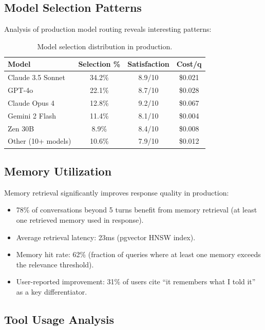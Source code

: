 \subsection{Model Selection Patterns}

Analysis of production model routing reveals interesting patterns:

\begin{table}[H]
\centering
\small
\begin{tabular}{lccc}
\toprule
\textbf{Model} & \textbf{Selection \%} & \textbf{Satisfaction} & \textbf{Cost/q} \\
\midrule
Claude 3.5 Sonnet & 34.2\% & 8.9/10 & \$0.021 \\
GPT-4o & 22.1\% & 8.7/10 & \$0.028 \\
Claude Opus 4 & 12.8\% & 9.2/10 & \$0.067 \\
Gemini 2 Flash & 11.4\% & 8.1/10 & \$0.004 \\
Zen 30B & 8.9\% & 8.4/10 & \$0.008 \\
Other (10+ models) & 10.6\% & 7.9/10 & \$0.012 \\
\bottomrule
\end{tabular}
\caption{Model selection distribution in production.}
\label{tab:model_selection}
\end{table}

\subsection{Memory Utilization}

Memory retrieval significantly improves response quality in production:

\begin{itemize}[leftmargin=1.1em]
    \item 78\% of conversations beyond 5 turns benefit from memory retrieval (at least one retrieved memory used in response).
    \item Average retrieval latency: 23ms (pgvector HNSW index).
    \item Memory hit rate: 62\% (fraction of queries where at least one memory exceeds the relevance threshold).
    \item User-reported improvement: 31\% of users cite ``it remembers what I told it'' as a key differentiator.
\end{itemize}

\subsection{Tool Usage Analysis}

